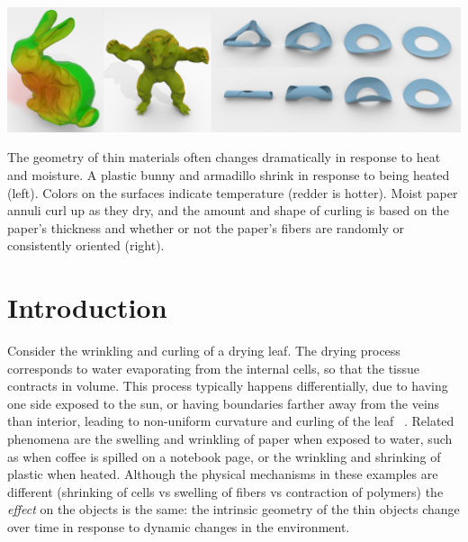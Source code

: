 \documentclass[timestamp,acmtog]{acmart}
\begin{document}

%
%
\begin{teaserfigure}
  \centering
  \includegraphics[width=\textwidth]{teasernew.png}
  \caption{The geometry of thin materials often changes dramatically in response to heat and moisture. A plastic bunny and armadillo shrink in response to being heated (left). Colors on the surfaces indicate temperature (redder is hotter). Moist paper annuli curl up as they dry, and the amount and shape of curling is based on the paper's thickness and whether or not the paper's fibers are randomly or consistently oriented (right).}
\end{teaserfigure}

\maketitle

\section{Introduction}
Consider the wrinkling and curling of a drying leaf. The drying process corresponds to water evaporating from the internal cells, so that the tissue contracts in volume. This process typically happens differentially, due to having one side exposed to the sun, or having boundaries farther away from the veins than interior, leading to non-uniform curvature and curling of the leaf ~\cite{Xiao2011, Jeong2013}. Related phenomena are the swelling and wrinkling of paper when exposed to water, such as when coffee is spilled on a notebook page, or the wrinkling and shrinking of plastic when heated. Although the physical mechanisms in these examples are different (shrinking of cells vs swelling of fibers vs contraction of polymers) the \emph{effect} on the objects is the same: the intrinsic geometry of the thin objects change over time in response to dynamic changes in the environment. 
\end{document}
